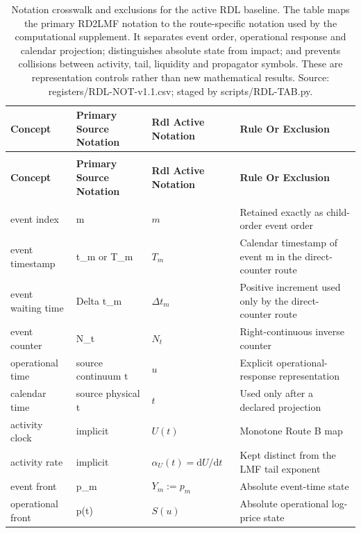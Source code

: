 \documentclass[10pt,a4paper,landscape]{article}
\begin{document}
\footnotesize
\begin{longtable}{@{}>{\RaggedRight\arraybackslash}p{3.0cm}>{\RaggedRight\arraybackslash}p{4.2cm}>{\RaggedRight\arraybackslash}p{5.0cm}>{\RaggedRight\arraybackslash}p{12.0cm}@{}}
\caption{Notation crosswalk and exclusions for the active RDL baseline. The table maps the primary RD2LMF notation to the route-specific notation used by the computational supplement. It separates event order, operational response and calendar projection; distinguishes absolute state from impact; and prevents collisions between activity, tail, liquidity and propagator symbols. These are representation controls rather than new mathematical results. Source: registers/RDL-NOT-v1.1.csv; staged by scripts/RDL-TAB.py.}\label{tab:rdl-t01}\\
\toprule
\textbf{Concept} & \textbf{Primary Source Notation} & \textbf{Rdl Active Notation} & \textbf{Rule Or Exclusion} \\
\midrule
\endfirsthead
\multicolumn{4}{l}{\tablename\ \thetable\ continued}\\
\toprule
\textbf{Concept} & \textbf{Primary Source Notation} & \textbf{Rdl Active Notation} & \textbf{Rule Or Exclusion} \\
\midrule
\endhead
\midrule
\multicolumn{4}{r}{Continued on next page}\\
\endfoot
\bottomrule
\endlastfoot
event index & m & \(m\) & Retained exactly as child-order event order \\
event timestamp & t\_m or T\_m & \(T_m\) & Calendar timestamp of event m in the direct-counter route \\
event waiting time & Delta t\_m & \(\Delta t_m\) & Positive increment used only by the direct-counter route \\
event counter & N\_t & \(N_t\) & Right-continuous inverse counter \\
operational time & source continuum t & \(u\) & Explicit operational-response representation \\
calendar time & source physical t & \(t\) & Used only after a declared projection \\
activity clock & implicit & \(U(t)\) & Monotone Route B map \\
activity rate & implicit & \(\alpha_U(t)=\mathrm dU/\mathrm dt\) & Kept distinct from the LMF tail exponent \\
event front & p\_m & \(Y_m:=p_m\) & Absolute event-time state \\
operational front & p(t) & \(S(u)\) & Absolute operational log-price state \\

\end{longtable}
\end{document}
